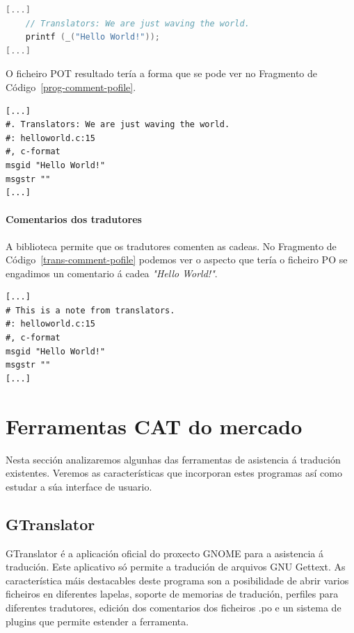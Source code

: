 \begin{lstlisting}[label=prog-comment-code,language=C,caption=Tradución con comentario.]
[...]
    // Translators: We are just waving the world.
    printf (_("Hello World!"));
[...]
\end{lstlisting}

O ficheiro POT resultado tería a forma que se pode ver no Fragmento de Código~\ref{prog-comment-pofile}.

\begin{lstlisting}[label=prog-comment-pofile,caption=Ficheiro POT con comentario.]
[...]
#. Translators: We are just waving the world.
#: helloworld.c:15
#, c-format
msgid "Hello World!"
msgstr ""
[...]
\end{lstlisting}


\paragraph{Comentarios dos tradutores}
A biblioteca permite que os tradutores comenten as cadeas. No Fragmento de Código~\ref{trans-comment-pofile} podemos ver o aspecto que tería o ficheiro PO se engadimos un comentario á cadea \emph{"Hello World!"}.

\begin{lstlisting}[label=trans-comment-pofile,caption=Ficheiro PO con comentario.]
[...]
# This is a note from translators.
#: helloworld.c:15
#, c-format
msgid "Hello World!"
msgstr ""
[...]
\end{lstlisting}

\section{Ferramentas CAT do mercado}
\label{sec:ferramentascat}
Nesta sección analizaremos algunhas das ferramentas de asistencia á tradución existentes. Veremos as características que incorporan estes programas así como estudar a súa interface de usuario.

\subsection{GTranslator}
GTranslator é a aplicación oficial do proxecto GNOME para a asistencia á tradución. Este aplicativo só permite a tradución de arquivos GNU Gettext. As característica máis destacables deste programa son a posibilidade de abrir varios ficheiros en diferentes lapelas, soporte de memorias de tradución, perfiles para diferentes tradutores, edición dos comentarios dos ficheiros .po e un sistema de plugins que permite estender a ferramenta.

